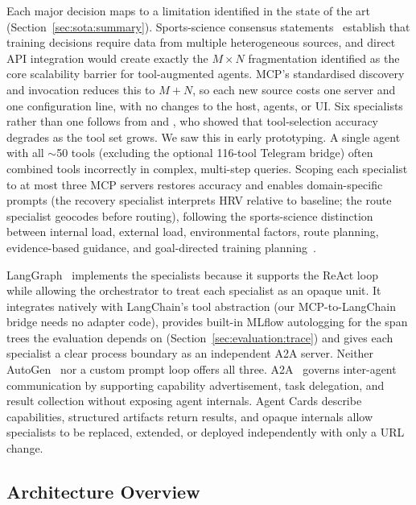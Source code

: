 Each major decision maps to a limitation identified in the state of the art (Section~\ref{sec:sota:summary}). Sports-science consensus statements~\citep{bourdon_monitoring_2017, kellmann_recovery_2018} establish that training decisions require data from multiple heterogeneous sources, and direct API integration would create exactly the $M \times N$ fragmentation \cite{yang_survey_2025} identified as the core scalability barrier for tool-augmented agents. MCP's standardised discovery and invocation reduces this to $M + N$, so each new source costs one server and one configuration line, with no changes to the host, agents, or UI. Six specialists rather than one follows from \cite{qu_tool_2024} and \cite{patil_gorilla_2023}, who showed that tool-selection accuracy degrades as the tool set grows. We saw this in early prototyping. A single agent with all $\sim$50 tools (excluding the optional 116-tool Telegram bridge) often combined tools incorrectly in complex, multi-step queries. Scoping each specialist to at most three MCP servers restores accuracy and enables domain-specific prompts (the recovery specialist interprets HRV relative to baseline; the route specialist geocodes before routing), following the sports-science distinction between internal load, external load, environmental factors, route planning, evidence-based guidance, and goal-directed training planning~\citep{bourdon_monitoring_2017, gabbett_training_2016, kellmann_recovery_2018}.

LangGraph~\citep{langchain_langgraph_2024} implements the specialists because it supports the ReAct loop~\citep{yao_react_2023} while allowing the orchestrator to treat each specialist as an opaque unit. It integrates natively with LangChain's tool abstraction (our MCP-to-LangChain bridge needs no adapter code), provides built-in MLflow autologging for the span trees the evaluation depends on (Section~\ref{sec:evaluation:trace}) and gives each specialist a clear process boundary as an independent A2A server. Neither AutoGen~\citep{wu_autogen_2023} nor a custom prompt loop offers all three. A2A~\citep{google_a2a_2025} governs inter-agent communication by supporting capability advertisement, task delegation, and result collection without exposing agent internals. Agent Cards describe capabilities, structured artifacts return results, and opaque internals allow specialists to be replaced, extended, or deployed independently with only a URL change.

\subsection{Architecture Overview}\label{sec:architecture:overview}

